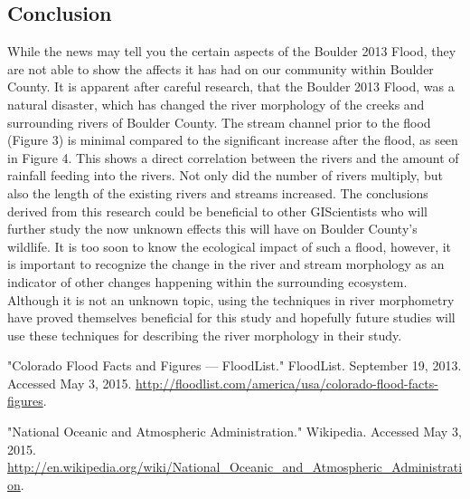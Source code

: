 \documentclass[twoside]{article}
\begin{document}
\begin{multicols}{2}
\section{Conclusion}
While the news may tell you the certain aspects of the Boulder 2013 Flood, they are not able to show the affects it has had on our community within Boulder County. It is apparent after careful research, that the Boulder 2013 Flood, was a natural disaster, which has changed the river morphology of the creeks and surrounding rivers of Boulder County. The stream channel prior to the flood (Figure 3) is minimal compared to the significant increase after the flood, as seen in Figure 4. This shows a direct correlation between the rivers and the amount of rainfall feeding into the rivers. Not only did the number of rivers multiply, but also the length of the existing rivers and streams increased. The conclusions derived from this research could be beneficial to other GIScientists who will further study the now unknown effects this will have on Boulder County's wildlife. It is too soon to know the ecological impact of such a flood, however, it is important to recognize the change in the river and stream morphology as an indicator of other changes happening within the surrounding ecosystem. Although it is not an unknown topic, using the techniques in river morphometry have proved themselves beneficial for this study and hopefully future studies will use these techniques for describing the river morphology in their study.





\begin{thebibliography}{100} %

\newblock "Colorado Flood Facts and Figures --- FloodList." FloodList. September 19, 2013. Accessed May 3, 2015. \url{http://floodlist.com/america/usa/colorado-flood-facts-figures}.

\newblock "National Oceanic and Atmospheric Administration." Wikipedia. Accessed May 3, 2015. \url{http://en.wikipedia.org/wiki/National_Oceanic_and_Atmospheric_Administration}.


\end{thebibliography}
\end{multicols}
\end{document}

